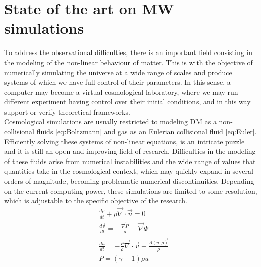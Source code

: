 \section{State of the art on MW simulations}
To address the observational difficulties, there is an important field consisting in the modeling of the non-linear behaviour of matter. 
This is with the objective of numerically simulating the universe at a wide range of scales and produce systems of which we have full control of their parameters. 
In this sense, a computer may become a virtual cosmological laboratory, where we may run different experiment having control over their initial conditions, and in this way support or verify theoretical frameworks. \\


Cosmological simulations are usually restricted to modeling DM as a non-collisional fluids \eqref{eq:Boltzmann} and gas as an Eulerian collisional fluid \eqref{eq:Euler}.  Efficiently solving these systems of non-linear equations, is an intricate puzzle and it is still an open and improving field of research. 
Difficulties in the modeling of these fluids arise from numerical instabilities and the wide range of values that quantities take in the cosmological context, which may quickly expand in several orders of magnitude, becoming problematic numerical discontinuities. Depending on the current computing power, these simulations are limited to some resolution, which is adjustable to the specific objective of the research.\\


\begin{align}
&\frac{d\rho}{dt} + \rho \vec{\nabla}\cdot\vec{v} = 0\\
&\frac{d\vec{v}}{dt} = -\frac{\vec{\nabla}P}{\rho} - \vec{\nabla} \Phi \\
&\frac{du}{dt} = -\frac{P}{\rho}\vec{\nabla}\cdot\vec{v} - \frac{\vec{\Lambda(u,\rho)}}{\rho}\\
& P = (\gamma -1 )\rho u
\label{eq:Euler}
\end{align}


